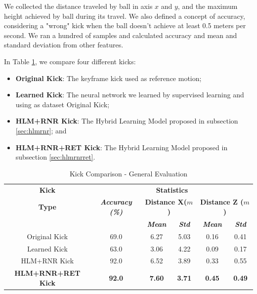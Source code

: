 We collected the distance traveled by ball in axis $x$ and $y$, and the maximum height achieved by ball during its travel. We also defined a concept of accuracy, considering a "wrong" kick when the ball doesn't achieve at least 0.5 meters per second. We ran a hundred of samples and calculated accuracy and mean and standard deviation from other features.

In Table \ref{tab:finaltest}, we compare four different kicks:

\begin{itemize}
	\item \textbf{Original Kick}: The keyframe kick used as reference motion;
	\item \textbf{Learned Kick}: The neural network we learned by supervised learning and using as dataset Original Kick;
	\item \textbf{HLM+RNR Kick}: The Hybrid Learning Model proposed in subsection \ref{sec:hlmrnr}; and
	\item \textbf{HLM+RNR+RET Kick}: The Hybrid Learning Model proposed in subsection \ref{sec:hlmrnrret}.
\end{itemize}

\begin{table}[!htbp]
	\caption{Kick Comparison - General Evaluation}
	\begin{center} 
		\begin{tabular}{|c|c|c|c|c|c|}
			\hline
			\textbf{Kick}&\multicolumn{5}{|c|}{\textbf{Statistics}} \\
			\cline{2-6} 
			\textbf{Type} & \textbf{\textit{Accuracy (\%)}}& \multicolumn{2}{|c|}{\textbf{Distance X(\(m\))}}& 
			\multicolumn{2}{|c|}{\textbf{Distance Z (\(m\))}}\\
			\cline {3-6} 
			& & \textbf{\textit{Mean}}& \textbf{\textit{Std}}
			& \textbf{\textit{Mean}}& \textbf{\textit{Std}}\\
			\hline
			Original Kick & 69.0 & 6.27 & 5.03 & 0.16 & 0.41 \\
			\hline
			Learned Kick & 63.0 & 3.06 & 4.22 & 0.09 & 0.17 \\
			\hline
			HLM+RNR Kick  & 92.0 & 6.52 & 3.89 & 0.33 & 0.55  \\
			\hline
			\textbf{HLM+RNR+RET Kick}  & \textbf{92.0} & \textbf{7.60} & \textbf{3.71} & \textbf{0.45} & \textbf{0.49}  \\
			\hline
		\end{tabular}
		\label{tab:finaltest}
	\end{center}
\end{table}

